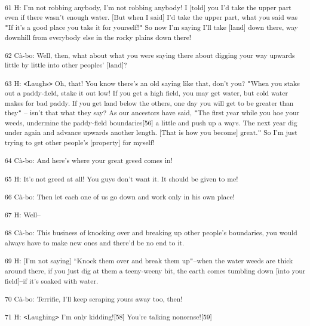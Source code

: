 {\textsuperscript{61 H: I'm not robbing anybody, I'm not robbing anybody!
I [told] you I'd take the upper part even if there wasn't enough water. [But when
I said] I'd take the upper part, what you said was \texttt{"}If it's a good place
you take it for yourself!\texttt{"} So now I'm saying I'll take [land] down there,
way downhill from everybody else in the rocky plains down there! }}

{\textsuperscript{62 Cà-bo: Well, then, what about what you were saying
there about digging your way upwards little by little into other peoples' [land]?}}

{\textsuperscript{63 H: \texttt{<}Laughs\texttt{>} Oh, that! You know there's
an old saying like that, don't you? \texttt{"}When you stake out a paddy-field,
stake it out low! If you get a high field, you may get water, but cold water makes
for bad paddy. If you get land below the others, one day you will get to be greater
than they\texttt{"} -- isn't that what they say? As our ancestors have said, \texttt{"}The
first year while you hoe your weeds, undermine the paddy-field boundaries[56] a
little and push up a ways. The next year dig under again and advance upwards another
length. [That is how you become] great.\texttt{"} So I'm just trying to get other
people's [property] for myself! }}

{\textsuperscript{64 Cà-bo: And here's where your great greed comes in!}}

{\textsuperscript{65 H: It's not greed at all! You guys don't want it. It
should be given to me!}}

{\textsuperscript{66 Cà-bo: Then let each one of us go down and work only
in his own place!}}

{\textsuperscript{67 H: Well--}}

{\textsuperscript{68 Cà-bo: This business of knocking over and breaking
up other people's boundaries, you would always have to make new ones and there'd
be no end to it.}}

{\textsuperscript{69 H: [I'm not saying] ``Knock them over and break them
up\texttt{"}--when the water weeds are thick around there, if you just dig at them
a teeny-weeny bit, the earth comes tumbling down [into your field]--if it's soaked
with water. }}

{\textsuperscript{70 Cà-bo: Terrific, I'll keep scraping yours away too,
then!}}

{\textsuperscript{71 H: \texttt{<}Laughing\texttt{>} I'm only kidding![58]
You're talking nonsense![59]}}

